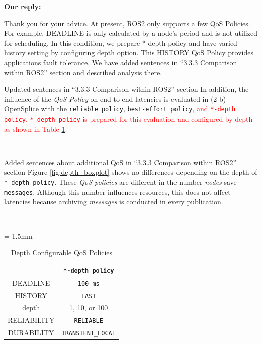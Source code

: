 \documentclass{article}
\begin{document}
\begin{enumerate}
  \begin{flushleft}
    \textbf{Our reply:}
  \end{flushleft}
  Thank you for your advice.
  At present, ROS2 only supports a few QoS Policies.
  For example, DEADLINE is only calculated by a node's period and is not utilized for scheduling.
  In this condition, we prepare *-depth policy and have varied history setting by configuring depth option.
  This HISTORY QoS Policy provides applications fault tolerance.
  We have added sentences in ``3.3.3 Comparison within ROS2'' section and described analysis there.
  \begin{itembox}[|]{Updated sentences in ``3.3.3 Comparison within ROS2'' section}
    In addition, the influence of the \emph{QoS Policy} on end-to-end latencies is evaluated in (2-b) OpenSplice with the \texttt{reliable policy}, \texttt{best-effort policy}\textcolor{red}{, and \texttt{*-depth policy}.
      \texttt{*-depth policy} is prepared for this evaluation and configured by depth as shown in Table \ref{tb:depth_qos}.}
  \end{itembox}\\
  \begin{itembox}[|]{Added sentences about additional QoS in ``3.3.3 Comparison within ROS2'' section}
    Figure \ref{fig:depth_boxplot} shows no differences depending on the depth of \texttt{*-depth policy}.
    These \emph{QoS policies} are different in the number \emph{nodes} save \texttt{messages}.
    Although this number influences resources, this does not affect latencies because archiving \emph{messages} is conducted in every publication.
  \end{itembox}\\
  \renewcommand{\arraystretch}{1.0}
  \setcounter{table}{4}
  \begin{table}[H]
    \caption{\label{tb:depth_qos}Depth Configurable QoS Policies}
    \centering
    \tabcolsep = 1.5mm              %
    \begin{tabular}{c|c}
      \hline
      & \textbf{\texttt{*-depth policy} }\\
      \hline
      \hline
      DEADLINE & \texttt{100 ms}\\
      HISTORY & \texttt{LAST}\\
      depth & 1, 10, or 100\\
      RELIABILITY & \texttt{RELIABLE}\\
      DURABILITY & \texttt{TRANSIENT\_LOCAL}\\
      \hline
    \end{tabular}

\end{table}
\end{enumerate}
\end{document}
